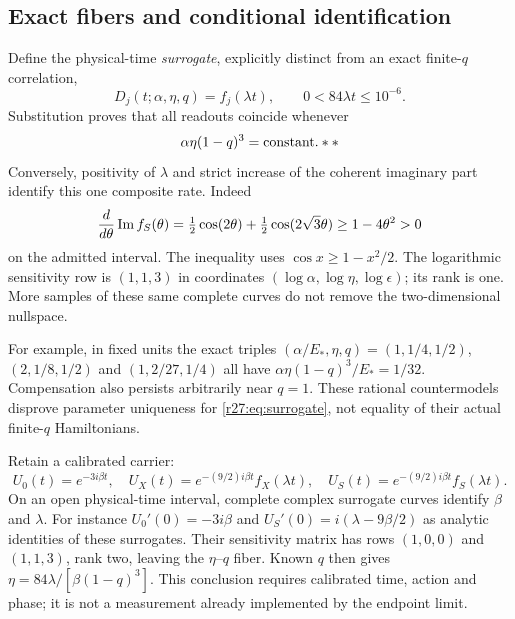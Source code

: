 \subsection{Exact fibers and conditional identification}
Define the physical-time \emph{surrogate}, explicitly distinct from an exact finite-$q$ correlation,
\begin{equation}
D_j(t;\alpha,\eta,q)=f_j(\lambda t),\qquad 0<84\lambda t\le10^{-6}.
\label{r27:eq:surrogate}
\end{equation}
Substitution proves that all readouts coincide whenever
\begin{equation}
\alpha\eta(1-q)^3=\text{constant}.**
\label{r27:eq:fiber}
\end{equation}
Conversely, positivity of $\lambda$ and strict increase of the coherent imaginary part identify this one composite rate. Indeed
\begin{equation}
\frac{d}{d\theta}\operatorname{Im} f_S(\theta)
=\tfrac12\cos(2\theta)+\tfrac12\cos(2\sqrt3\theta)
\ge1-4\theta^2>0
\label{r27:eq:monotone}
\end{equation}
on the admitted interval. The inequality uses $\cos x\ge1-x^2/2$. The logarithmic sensitivity row is $(1,1,3)$ in coordinates $(\log\alpha,\log\eta,\log\epsilon)$; its rank is one. More samples of these same complete curves do not remove the two-dimensional nullspace.

For example, in fixed units the exact triples
$(\alpha/E_*,\eta,q)=(1,1/4,1/2)$, $(2,1/8,1/2)$ and $(1,2/27,1/4)$ all have $\alpha\eta(1-q)^3/E_*=1/32$. Compensation also persists arbitrarily near $q=1$. These rational countermodels disprove parameter uniqueness for \eqref{r27:eq:surrogate}, not equality of their actual finite-$q$ Hamiltonians.

Retain a calibrated carrier:
\begin{equation}
U_0(t)=e^{-3i\beta t},\quad
U_X(t)=e^{-(9/2)i\beta t}f_X(\lambda t),\quad
U_S(t)=e^{-(9/2)i\beta t}f_S(\lambda t).
\label{r27:eq:carrier}
\end{equation}
On an open physical-time interval, complete complex surrogate curves identify $\beta$ and $\lambda$. For instance $U_0'(0)=-3i\beta$ and
$U_S'(0)=i(\lambda-9\beta/2)$ as analytic identities of these surrogates. Their sensitivity matrix has rows $(1,0,0)$ and $(1,1,3)$, rank two, leaving the $\eta$--$q$ fiber. Known $q$ then gives
$\eta=84\lambda/[\beta(1-q)^3]$. This conclusion requires calibrated time, action and phase; it is not a measurement already implemented by the endpoint limit.

